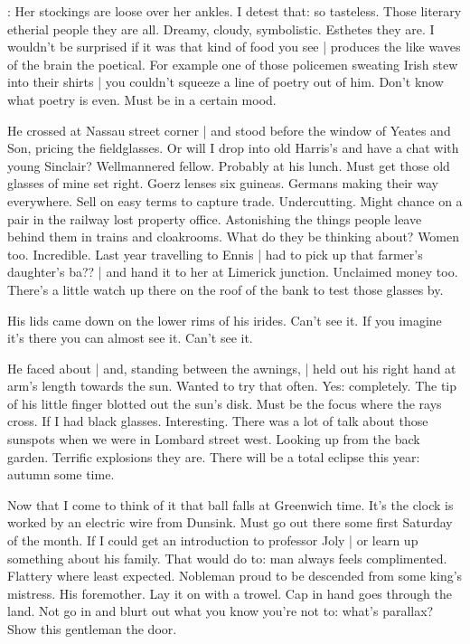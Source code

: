 \BloomInt:
Her stockings are loose over her ankles.
I detest that:
so tasteless.
Those literary etherial people they are all.
Dreamy,
cloudy,
symbolistic.
Esthetes they are.
I wouldn't be surprised if it was that kind of food you see |
produces the like waves of the brain the poetical.
For example
one of those policemen sweating Irish stew into their shirts |
you couldn't squeeze a line of poetry out of him.
Don't know what poetry is even.
Must be in a certain mood.

%

He crossed at Nassau street corner |
and stood before the window of Yeates and Son,
pricing the fieldglasses.
Or will I drop into old Harris's
and have a chat with young Sinclair?
Wellmannered fellow.
Probably at his lunch.
Must get those old glasses of mine set right.
Goerz lenses six guineas.
Germans making their way everywhere.
Sell on easy terms to capture trade.
Undercutting.
Might chance on a pair in the railway lost property office.
Astonishing the things people leave behind them in trains and cloakrooms.
What do they be thinking about?
Women too.
Incredible.
Last year travelling to Ennis |
had to pick up that farmer's daughter's ba?? |
and hand it to her at Limerick junction.
Unclaimed money too.
There's a little watch up there on the roof of the bank 
to test those glasses by.

His lids came down on the lower rims of his irides.
Can't see it.
If you imagine it's there you can almost see it.
Can't see it.

He faced about |
and, standing between the awnings, |
held out his right hand at arm's length towards the sun.
Wanted to try that often.
Yes:
completely.
The tip of his little finger blotted out the sun's disk.
Must be the focus where the rays cross.
If I had black glasses.
Interesting.
There was a lot of talk about those sunspots when we were in Lombard street west.
Looking up from the back garden.
Terrific explosions they are.
There will be a total eclipse this year:
autumn some time.

Now that I come to think of it 
that ball falls at Greenwich time.
It's the clock is worked by an electric wire from Dunsink.
Must go out there
some first Saturday of the month.
If I could get an introduction to professor Joly |
or learn up something about his family.
That would do to:
man always feels complimented.
Flattery where least expected.
Nobleman proud to be descended from some king's mistress.
His foremother.
Lay it on with a trowel.
Cap in hand goes through the land.
Not go in and blurt out what you know you're not to:
what's parallax?
Show this gentleman the door.

